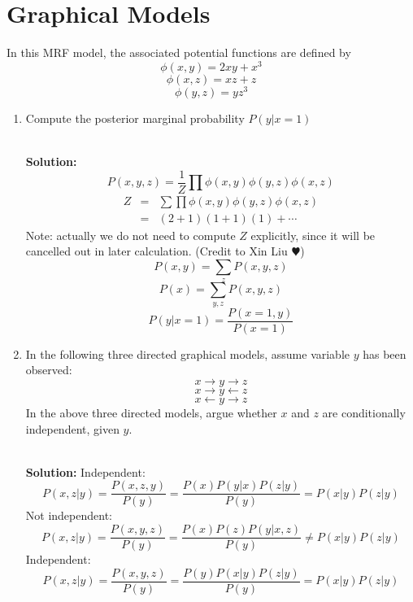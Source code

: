 

\section{Graphical Models}

In this MRF model, the associated potential functions are defined by 
\[
\phi(x,y)=2xy+x^3
\]
\[
\phi(x,z)=xz+z
\]
\[
\phi(y,z)=yz^3
\]

\begin{enumerate}
\item Compute the posterior marginal probability $P(y|x=1)$

\ \\{\bf Solution:} 
\[
P(x,y,z) = \frac{1}{Z} \prod \phi(x,y)\phi(y,z)\phi(x,z) 
\]
\begin{eqnarray*}
Z &=& \sum\prod \phi(x,y)\phi(y,z)\phi(x,z) \\
&=& (2+1)(1+1)(1) + \cdots
\end{eqnarray*}
Note: actually we do not need to compute $Z$ explicitly, since it will be cancelled out in later calculation. (Credit to Xin Liu $\varheartsuit$)
\[
P(x,y) = \sum_z P(x,y,z)
\]
\[
P(x) = \sum_{y,z} P(x,y,z)
\]
\[
P(y|x=1) = \frac{P(x=1,y)}{P(x=1)}
\]

\item In the following three directed graphical models, assume variable $y$ has been observed:
\[
x\rightarrow y\rightarrow z
\]
\[
x\rightarrow y\leftarrow z
\]
\[
x\leftarrow y \rightarrow z
\]
In the above three directed models, argue whether $x$ and $z$ are conditionally independent, given $y$. 

\ \\{\bf Solution:} 
Independent:
\[
P(x,z|y) = \frac{P(x,z,y)}{P(y)} = \frac{P(x)P(y|x)P(z|y)}{P(y)} = P(x|y)P(z|y)
\]
Not independent:
\[
P(x,z|y) = \frac{P(x,y,z)}{P(y)} = \frac{P(x)P(z)P(y|x,z)}{P(y)}\ne P(x|y) P(z|y)
\]
Independent:
\[
P(x,z|y) = \frac{P(x,y,z)}{P(y)} = \frac{P(y)P(x|y)P(z|y)}{P(y)} = P(x|y) P(z|y)
\]
\end{enumerate}